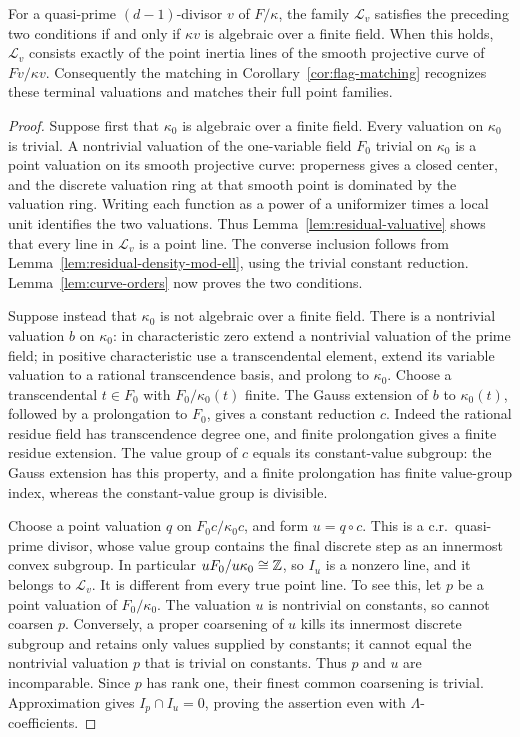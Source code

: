 \begin{proposition}\label{prop:point-recognition}
For a quasi-prime \((d-1)\)-divisor \(v\) of \(F/\kappa\), the family
\(\mathcal L_v\) satisfies the preceding two conditions if and only if
\(\kappa v\) is algebraic over a finite field.
When this holds, \(\mathcal L_v\) consists exactly of the point inertia
lines of the smooth projective curve of \(Fv/\kappa v\).
Consequently the matching in Corollary~\ref{cor:flag-matching}
recognizes these terminal valuations and matches their full point
families.
\end{proposition}

\begin{proof}
Suppose first that \(\kappa_0\) is algebraic over a finite field.
Every valuation on \(\kappa_0\) is trivial. A nontrivial valuation
of the one-variable field \(F_0\) trivial on \(\kappa_0\) is a point
valuation on its smooth projective curve: properness gives a closed
center, and the discrete valuation ring at that smooth point is
dominated by the valuation ring. Writing each function as a power
of a uniformizer times a local unit identifies the two valuations.
Thus
Lemma~\ref{lem:residual-valuative} shows that every line in
\(\mathcal L_v\) is a point line. The converse inclusion follows
from Lemma~\ref{lem:residual-density-mod-ell}, using the trivial
constant reduction. Lemma~\ref{lem:curve-orders} now proves the two
conditions.

Suppose instead that \(\kappa_0\) is not algebraic over a finite field.
There is a nontrivial valuation \(b\) on \(\kappa_0\): in
characteristic zero extend a nontrivial valuation of the prime
field; in positive characteristic use a transcendental element,
extend its variable valuation to a rational transcendence basis,
and prolong to \(\kappa_0\).
Choose a transcendental \(t\in F_0\) with \(F_0/\kappa_0(t)\) finite.
The Gauss extension of \(b\) to \(\kappa_0(t)\), followed by a
prolongation to \(F_0\), gives a constant reduction \(c\).
Indeed the rational residue field has transcendence degree one,
and finite prolongation gives a finite residue extension.
The value group of \(c\) equals its constant-value subgroup: the
Gauss extension has this property, and a finite prolongation has
finite value-group index, whereas the constant-value group is
divisible.

Choose a point valuation \(q\) on \(F_0c/\kappa_0c\), and form
\(u=q\circ c\). This is a c.r.\ quasi-prime divisor, whose value
group contains the final discrete step as an innermost convex
subgroup. In particular \(uF_0/u\kappa_0\cong\mathbb Z\), so \(I_u\) is a
nonzero line, and it belongs to \(\mathcal L_v\).
It is different from every true point line. To see this, let \(p\)
be a point valuation of \(F_0/\kappa_0\). The valuation \(u\) is
nontrivial on constants, so cannot coarsen \(p\). Conversely, a
proper coarsening of \(u\) kills its innermost discrete subgroup
and retains only values supplied by constants; it cannot equal
the nontrivial valuation \(p\) that is trivial on constants.
Thus \(p\) and \(u\) are incomparable. Since \(p\) has rank one,
their finest common coarsening is trivial. Approximation gives
\(I_p\cap I_u=0\), proving the assertion even with
\(\Lambda\)-coefficients.


\end{proof}
